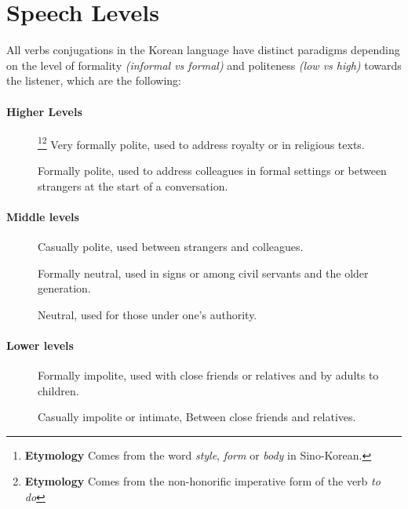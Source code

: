 \section{Speech Levels}
All verbs conjugations in the Korean language have distinct paradigms depending on the level of formality \textit{(informal vs formal)} and politeness \textit{(low vs high)} towards the listener, which are the following:

\paragraph{Higher Levels}
\begin{description}
    \item[]\footnote{\textbf{Etymology} Comes from the word \textit{style}, \textit{form} or \textit{body} in Sino-Korean.}\footnote{\textbf{Etymology}  Comes from the non-honorific imperative form of the verb \textit{to do} } Very formally polite, used to address royalty or in religious texts.
    \item[] Formally polite, used to address colleagues in formal settings or between strangers at the start of a conversation.
\end{description}

\paragraph{Middle levels}
\begin{description}
    \item [] Casually polite, used between strangers and colleagues.
    \item [] Formally neutral, used in signs or among civil servants and the older generation.
    \item [] Neutral, used for those under one's authority.
\end{description}

\paragraph{Lower levels}
\begin{description}
    \item [] Formally impolite, used with close friends or relatives and by adults to children.
    \item [] Casually impolite or intimate, Between close friends and relatives.
\end{description}

